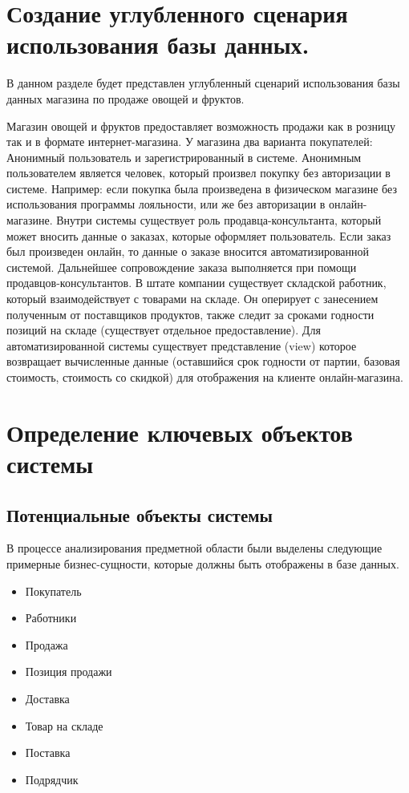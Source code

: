 \documentclass[14pt]{extreport}
\begin{document}
\pagestyle{empty} %


\pagestyle{plain} %

\chapter{Создание углубленного сценария использования базы данных.}

В данном разделе будет представлен углубленный сценарий использования базы данных магазина по продаже овощей и фруктов.


Магазин овощей и фруктов предоставляет возможность продажи как в розницу так и в формате интернет-магазина. У магазина два варианта покупателей: Анонимный пользователь и зарегистрированный в системе. Анонимным пользователем является человек, который произвел покупку без авторизации в системе. Например: если покупка была произведена в физическом магазине без использования программы лояльности, или же без авторизации в онлайн-магазине. Внутри системы существует роль продавца-консультанта, который может вносить данные о заказах, которые оформляет пользователь. Если заказ был произведен онлайн, то данные о заказе вносится автоматизированной системой. Дальнейшее сопровождение заказа выполняется при помощи продавцов-консультантов. В штате компании существует складской работник, который взаимодействует с товарами на складе. Он оперирует с занесением полученным от поставщиков продуктов, также следит за сроками годности позиций на складе (существует отдельное предоставление). Для автоматизированной системы существует представление (view) которое возвращает вычисленные данные (оставшийся срок годности от партии, базовая стоимость, стоимость со скидкой) для отображения на клиенте онлайн-магазина.

\chapter{Определение ключевых объектов системы}

    \section{Потенциальные объекты системы}
        В процессе анализирования предметной области были выделены следующие примерные бизнес-сущности, которые должны быть отображены в базе данных.

        \begin{itemize}
            \item Покупатель
            \item Работники
            \item Продажа
            \item Позиция продажи
            \item Доставка
            \item Товар на складе
            \item Поставка
            \item Подрядчик
        \end{itemize}
    
\end{document}
